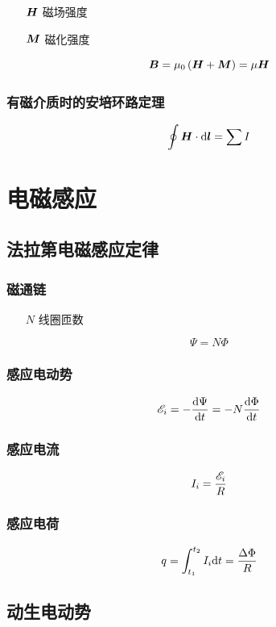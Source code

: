 \documentclass{article}
\begin{document}
\begin{enumerate}
    \item [$\boldsymbol{H}$] 磁场强度
    \item [$\boldsymbol{M}$] 磁化强度
\end{enumerate}

\[\boldsymbol{B}=\mu_0\left(\boldsymbol{H}+\boldsymbol{M}\right)=\mu\boldsymbol{H}\]

\subsubsection{有磁介质时的安培环路定理}

\[\oint\boldsymbol{H}\cdot\mathrm d\boldsymbol{l}=\sum I\]

\section{电磁感应}

\subsection{法拉第电磁感应定律}

\subsubsection{磁通链}

\begin{enumerate}
    \item [$N$] 线圈匝数
\end{enumerate}

\[\Psi=N\Phi\]

\subsubsection{感应电动势}

\[\mathscr E_i=-\frac{\mathrm d\Psi}{\mathrm d t}=-N\frac{\mathrm d\Phi}{\mathrm d t}\]

\subsubsection{感应电流}

\[I_i=\frac{\mathscr E_i}R\]

\subsubsection{感应电荷}

\[q=\int_{t_1}^{t_2}I_i\mathrm d t=\frac{\Delta\Phi}R\]

\subsection{动生电动势}
\end{document}
